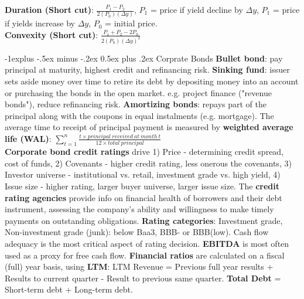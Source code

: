 \documentclass[10pt,landscape]{article}
\makeatletter
\renewcommand{\subsection}{\@startsection{subsection}{2}{0mm}%
                                {-1explus -.5ex minus -.2ex}%
                                {0.5ex plus .2ex}%
                                {\normalfont\normalsize\bfseries}}
\makeatother
\begin{document}
\begin{multicols}{3}
{\bf Duration (Short cut)}: $\frac{{P}_{1} - {P}_{2}}{2({P}_{0})(\Delta y)}$, ${P}_{1}$ = price if yield decline by $\Delta y$, ${P}_{1}$ = price if yields increase by $\Delta y$, ${P}_{0}$ = initial price.\\
{\bf Convexity (Short cut)}: $\frac{{P}_{1} + {P}_{2} - 2{P}_{0}}{2({P}_{0})(\Delta y)^2}$ 

\subsection{Corprate Bonds}
{\bf Bullet bond}: pay principal at maturity, highest credit and refinancing risk. {\bf Sinking fund}: issuer sets aside money over time to retire its debt by depositing money into an account or purchasing the bonds in the open market. e.g. project finance ("revenue bonds"), reduce refinancing risk. {\bf Amortizing bonds}: repays part of the principal along with the coupons in equal instalments (e.g. mortgage). The average time to receipt of principal payment is measured by {\bf weighted average life (WAL)}: $\sum_{t=1}^{n} \frac{t \times principal\ received\ at\ month\ t}{12 \times total\ principal}$\\
{\bf Corporate bond credit ratings} drive 1) Price - determining credit spread, cost of funds, 2) Covenants - higher credit rating, less onerous the covenants, 3) Investor universe - institutional vs. retail, investment grade vs. high yield, 4) Issue size - higher rating, larger buyer universe, larger issue size. The {\bf credit rating agencies} provide info on financial health of borrowers and their debt instrument, assessing the company's ability and willingness to make timely payments on outstanding obligations. {\bf Rating categories}: Investment grade, Non-investment grade (junk): below Baa3, BBB- or BBB(low). Cash flow adequacy is the most critical aspect of rating decision. {\bf EBITDA} is most often used as a proxy for free cash flow. {\bf Financial ratios} are calculated on a fiscal (full) year basis, using {\bf LTM}: LTM Revenue = Previous full year results + Results to current quarter - Result to previous same quarter. {\bf Total Debt} = Short-term debt + Long-term debt.

\end{multicols}
\end{document}
